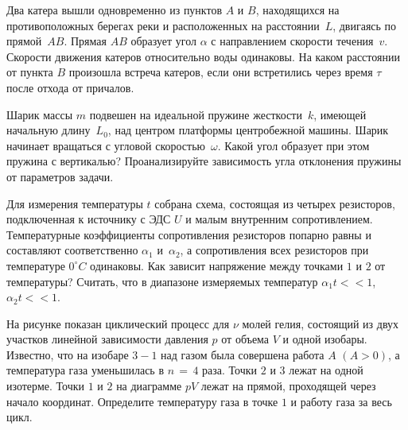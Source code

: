 \AddProb Два катера вышли одновременно из пунктов $A$ и $B$, находящихся на противоположных берегах реки и расположенных на расстоянии~$L$, 
двигаясь по прямой~$AB$. Прямая $AB$ образует угол $\alpha$ с направлением скорости течения~$v$. Скорости движения катеров относительно воды одинаковы. 
На каком расстоянии от пункта $B$ произошла встреча катеров, если они встретились через время $\tau$ после отхода от причалов.

\AddProb Шарик массы $m$ подвешен на идеальной пружине жесткости~$k$, имеющей начальную длину~$L_0$, над центром платформы центробежной машины. 
Шарик начинает вращаться с угловой скоростью~$\omega$. Какой угол образует при этом пружина с вертикалью? 
Проанализируйте зависимость угла отклонения пружины от параметров задачи.

\AddProb Для измерения температуры $t$ собрана схема, состоящая из четырех резисторов, подключенная к источнику с ЭДС $U$ и малым внутренним сопротивлением. 
Температурные коэффициенты сопротивления резисторов попарно равны и составляют соответственно $\alpha_1$ и~$\alpha_2$, 
а сопротивления всех резисторов при температуре $0^{\circ}C$ одинаковы. Как зависит напряжение между точками $1$ и $2$ от температуры? 
Считать, что в диапазоне измеряемых температур $\alpha_1t<<1$, $\alpha_2t<<1$.

\AddProb На рисунке показан циклический процесс для $\nu$ молей гелия, состоящий из двух участков линейной зависимости давления $p$ от объема $V$ 
и одной изобары. Известно, что на изобаре $3 - 1$ над газом была совершена работа $A$ $(A > 0)$, а температура газа уменьшилась в $n\,=\,4$ раза. 
Точки $2$ и $3$ лежат на одной изотерме. Точки $1$ и $2$ на диаграмме $pV$ лежат на прямой, проходящей через начало координат. 
Определите температуру газа в точке $1$ и работу газа за весь цикл.